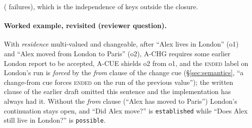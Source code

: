 (\ovClosureFail{} failures), which is the independence of keys outside the closure.

\paragraph{Worked example, revisited (reviewer question).} With \emph{residence} multi-valued and changeable, after ``Alex lives in London'' (o1) and ``Alex moved from London to Paris'' (o2), A-CHG requires some earlier London report to be accepted, A-CUE shields o2 from o1, and the \textsc{ended} label on London's run is \emph{forced} by the \emph{from} clause of the change cue (\S\ref{sec:semantics}, ``a change-from cue forces \textsc{ended} on the run of the previous value''); the written clause of the earlier draft omitted this sentence and the implementation has always had it. Without the \emph{from} clause (``Alex has moved to Paris'') London's continuation stays open, and ``Did Alex move?'' is \texttt{established} while ``Does Alex still live in London?'' is \texttt{possible}.
